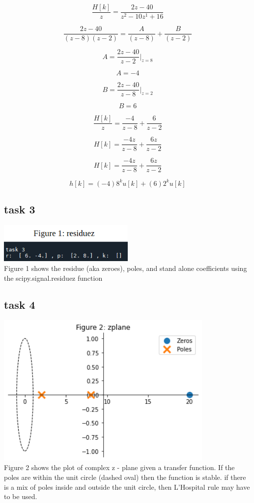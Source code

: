 \documentclass[12pt,a4paper]{article}
\begin{document}
\[\frac{H[k]}{z} = \frac{2 z - 40}{z^2 - 10 z^1 + 16}\]

\[\frac{2 z - 40}{(z-8)(z-2)} = \frac {A}  {(z-8)} + \frac{B}{(z-2)}\]

\[A = \frac{2 z - 40} {z-2} \Bigg|_{z = 8}  \]

\[A = -4\]

\[B = \frac{2 z - 40}{z-8} \Bigg|_{z = 2}  \]

\[B = 6\]


\[\frac{H[k]}{z} = \frac{-4} {z-8} + \frac {6}{z-2}\]

\[H[k] = \frac{-4 z}{z-8} + \frac{6 z}{z-2}\]

\[H[k] = \frac{-4 z}{z-8} + \frac{6 z}{z-2}\]


\[h[k] = (-4) 8^k u[k]+ (6) 2^k u[k]\]

\subsection*{task 3}

\includegraphics[width=0.5\textwidth]{Figure 1.png}\\
Figure 1 shows the residue (aka zeroes), poles, and stand alone coefficients using the scipy.signal.residuez function \\


\subsection*{task 4}
\includegraphics[width=0.8\textwidth]{Figure 2.png}\\
Figure 2 shows the plot of complex z - plane given a transfer function.  If the poles are within the unit circle (dashed oval) then the function is stable.  if there is a mix of poles inside and outside the unit circle, then L'Hospital rule may have to be used.\\
\end{document}
